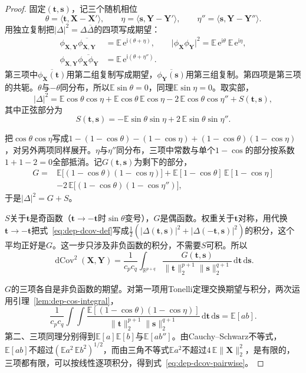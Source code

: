 \begin{proof}
固定$(\bm{t},\bm{s})$，记三个随机相位
\[
  \theta=\langle\bm{t},\bm{X}-\bm{X}'\rangle,\qquad \eta=\langle\bm{s},\bm{Y}-\bm{Y}'\rangle,\qquad \eta''=\langle\bm{s},\bm{Y}-\bm{Y}''\rangle .
\]
用独立复制把$\lvert\Delta\rvert^{2}=\Delta\overline{\Delta}$的四项写成期望：
\[
  \begin{aligned}
    \phi_{\bm{X},\bm{Y}}\overline{\phi_{\bm{X},\bm{Y}}}&=\mathbb{E}\,\mathrm{e}^{\mathrm{i}(\theta+\eta)},\qquad
    \lvert\phi_{\bm{X}}\phi_{\bm{Y}}\rvert^{2}=\mathbb{E}\,\mathrm{e}^{\mathrm{i}\theta}\ \mathbb{E}\,\mathrm{e}^{\mathrm{i}\eta},\\
    \phi_{\bm{X},\bm{Y}}\overline{\phi_{\bm{X}}\phi_{\bm{Y}}}&=\mathbb{E}\,\mathrm{e}^{\mathrm{i}(\theta+\eta'')} .
  \end{aligned}
\]
第三项中$\overline{\phi_{\bm{X}}(\bm{t})}$用第二组复制写成期望，$\overline{\phi_{\bm{Y}}(\bm{s})}$用第三组复制。第四项是第三项的共轭。$\theta$与$-\theta$同分布，所以$\mathbb{E}\sin\theta=0$，同理$\mathbb{E}\sin\eta=0$。取实部，
\[
  \lvert\Delta\rvert^{2}=\mathbb{E}\cos\theta\cos\eta+\mathbb{E}\cos\theta\,\mathbb{E}\cos\eta-2\,\mathbb{E}\cos\theta\cos\eta''+S(\bm{t},\bm{s}),
\]
其中正弦部分为
\[
  S(\bm{t},\bm{s})=-\mathbb{E}\sin\theta\sin\eta+2\,\mathbb{E}\sin\theta\sin\eta'' .
\]

把$\cos\theta\cos\eta$写成$1-(1-\cos\theta)-(1-\cos\eta)+(1-\cos\theta)(1-\cos\eta)$，对另外两项同样展开。$\eta$与$\eta''$同分布，三项中常数与单个$1-\cos$的部分按系数$1+1-2=0$全部抵消。记$G(\bm{t},\bm{s})$为剩下的部分，
\[
  \begin{aligned}
  G={}&\mathbb{E}\bigl[(1-\cos\theta)(1-\cos\eta)\bigr]+\mathbb{E}[1-\cos\theta]\,\mathbb{E}[1-\cos\eta]\\
  &-2\,\mathbb{E}\bigl[(1-\cos\theta)(1-\cos\eta'')\bigr],
  \end{aligned}
\]
于是$\lvert\Delta\rvert^{2}=G+S$。

$S$关于$\bm{t}$是奇函数（$\bm{t}\to-\bm{t}$时$\sin\theta$变号），$G$是偶函数。权重关于$\bm{t}$对称，用代换$\bm{t}\to-\bm{t}$把式~\eqref{eq:dep-dcov-def}写成$\frac12(\lvert\Delta(\bm{t},\bm{s})\rvert^{2}+\lvert\Delta(-\bm{t},\bm{s})\rvert^{2})$的积分，这个平均正好是$G$。这一步只涉及非负函数的积分，不需要$S$可积。所以
\[
  \operatorname{dCov}^{2}(\bm{X},\bm{Y})=\frac{1}{c_pc_q}\int_{\mathbb{R}^{p+q}}\frac{G(\bm{t},\bm{s})}{\lVert\bm{t}\rVert_2^{p+1}\lVert\bm{s}\rVert_2^{q+1}}\,\mathrm{d}\bm{t}\,\mathrm{d}\bm{s}.
\]

$G$的三项各自是非负函数的期望。对第一项用Tonelli定理交换期望与积分，两次运用引理~\ref{lem:dep-cos-integral}，
\[
  \frac{1}{c_pc_q}\int\!\!\int\frac{\mathbb{E}[(1-\cos\theta)(1-\cos\eta)]}{\lVert\bm{t}\rVert_2^{p+1}\lVert\bm{s}\rVert_2^{q+1}}\,\mathrm{d}\bm{t}\,\mathrm{d}\bm{s}=\mathbb{E}[ab].
\]
第二、三项同理分别得到$\mathbb{E}[a]\mathbb{E}[b]$与$\mathbb{E}[ab'']$。由Cauchy--Schwarz不等式，$\mathbb{E}[ab]$不超过$(\mathbb{E}a^{2}\,\mathbb{E}b^{2})^{1/2}$，而由三角不等式$\mathbb{E}a^{2}$不超过$4\,\mathbb{E}\lVert\bm{X}\rVert_2^{2}$，是有限的，三项都有限，可以按线性逐项积分，得到式~\eqref{eq:dep-dcov-pairwise}。
\end{proof}

